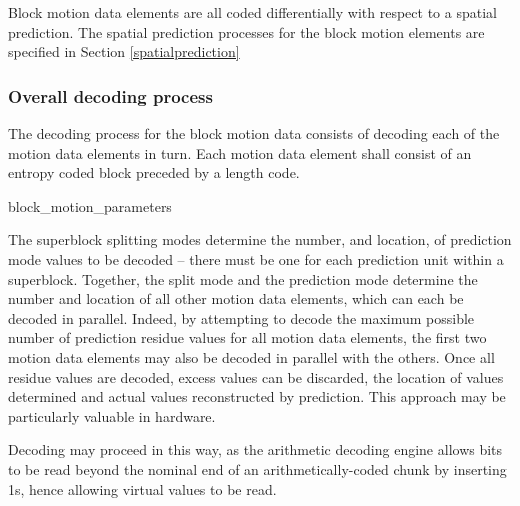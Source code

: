 Block motion data elements are all coded differentially with respect to a spatial prediction. The
spatial prediction processes for the block motion elements are specified in Section \ref{spatialprediction}

\subsubsection{Overall decoding process}

\label{decodingprocess}

The decoding process for the block motion data consists of decoding each of the motion
 data elements in turn. Each motion data element shall consist of an entropy coded block
 preceded by a length code.

\begin{pseudo}{block\_motion\_parameters}{}
\bsEND
{}
\end{pseudo}

\begin{informative}
The superblock splitting modes determine the number, and location, of 
prediction mode values to be decoded -- there
must be one for each prediction unit within a superblock. Together, the split 
mode and the prediction mode determine the number and location of all other 
motion data elements, which can each be decoded in parallel. Indeed,
by attempting to decode the maximum possible number of prediction residue 
values for all motion data elements, the first 
two motion data elements may also be decoded in parallel with the others. 
Once all residue values are decoded, excess
values can be discarded, the location of values determined and actual 
values reconstructed by prediction. This approach
may be particularly valuable in hardware.

Decoding may proceed in this way, as the arithmetic decoding engine 
allows bits to be read beyond the nominal end of an arithmetically-coded chunk by inserting 1s, hence allowing virtual values to be read.
\end{informative}

